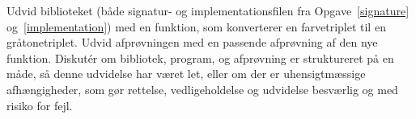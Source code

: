 Udvid biblioteket (både signatur- og implementationsfilen fra Opgave~\ref{signature} og~\ref{implementation}) med en funktion, som konverterer en farvetriplet til en gråtonetriplet. Udvid afprøvningen med en passende afprøvning af den nye funktion. Diskut\'{e}r om bibliotek, program, og afprøvning er struktureret på en måde, så denne udvidelse har været let, eller om der er uhensigtmæssige afhængigheder, som gør rettelse, vedligeholdelse og udvidelse besværlig og med risiko for fejl.
